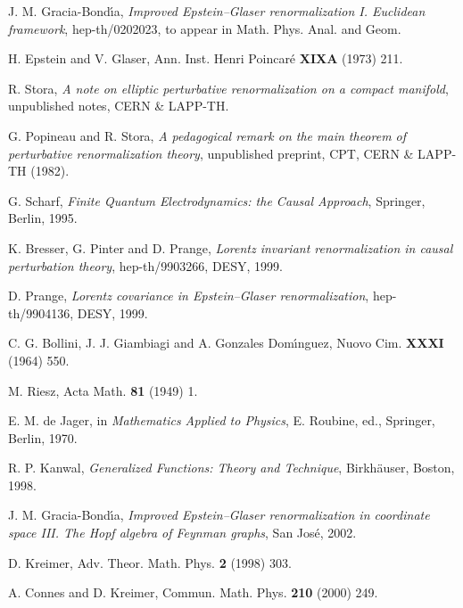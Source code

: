\documentclass[a4paper,12pt]{article}
\providecommand{\7}{\dagger}           %
\theoremstyle{plain}
\theoremstyle{definition}
\begin{document}
\begin{thebibliography}{34}

J. M. Gracia-Bond\'{\i}a,
\textsl{Improved Epstein--Glaser renormalization I. Euclidean
framework}, hep-th/0202023, to appear in Math. Phys. Anal. and Geom.

H. Epstein and V. Glaser,
Ann. Inst. Henri Poincar\'e {\bf XIXA} (1973) 211.

R. Stora,
\textsl{A note on elliptic perturbative renormalization on a compact
manifold}, unpublished notes, CERN \& LAPP-TH.

G. Popineau and R. Stora,
\textsl{A pedagogical remark on the main theorem of perturbative
renormalization theory},
unpublished preprint, CPT, CERN \& LAPP-TH (1982).

G. Scharf,
\textit{Finite Quantum Electrodynamics: the Causal Approach},
Springer, Berlin, 1995.

K. Bresser, G. Pinter and D. Prange,
\textsl{Lorentz invariant renormalization in causal perturbation
theory},
hep-th/9903266, DESY, 1999.

D. Prange,
\textsl{Lorentz covariance in Epstein--Glaser renormalization},
hep-th/9904136, DESY, 1999.

C. G. Bollini, J. J. Giambiagi and A. Gonzales Dom\'{\i}nguez,
Nuovo Cim. {\bf XXXI} (1964) 550.

M. Riesz,
Acta Math. {\bf 81} (1949) 1.

E. M. de Jager,
in \textit{Mathematics Applied to Physics}, E. Roubine, ed.,
Springer, Berlin, 1970.

R. P. Kanwal,
\textit{Generalized Functions: Theory and Technique},
Birkh\"auser, Boston, 1998.

J. M. Gracia-Bond\'{\i}a,
\textsl{Improved Epstein--Glaser renormalization in coordinate space
III. The Hopf algebra of Feynman graphs}, San Jos\'e, 2002.

D. Kreimer,
Adv. Theor. Math. Phys. {\bf 2} (1998) 303.

A. Connes and D. Kreimer,
Commun. Math. Phys. {\bf 210} (2000) 249.


\end{thebibliography}
\end{document}
